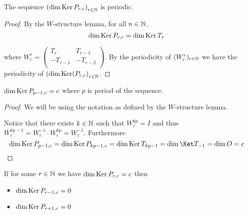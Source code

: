 \begin{proposition}
  The sequence $\left(\dim \operatorname{Ker} P_{r,c}\right)_{r\in\mathbb{N}}$
  is periodic.
\end{proposition}

\begin{proof}
  By the $W$-structure lemma, for all $n\in\mathbb{N}$,
  \[
  \dim\operatorname{Ker} P_{r,c}
  =
  \dim\operatorname{Ker} T_{r}
  \]

  where $W_{c}^{r}=\left(\begin{smallmatrix} T_{r} & T_{r-1}  \\ -T_{r-1} & -T_{r-2} \\\end{smallmatrix}\right)$.
  By the periodicity of $(W_{c}^{r})_{r\in\mathbb{N}}$ we have the
  periodicity of $\left(\dim\operatorname{Ker}(P_{r,c}\right)_{r\in\mathbb{N}}$.
\end{proof}

\begin{lemma}
  $\dim\operatorname{Ker} P_{p-1,c} = c$ where $p$ is period of the sequence.
\end{lemma}

\begin{proof}
  We will be using the notation as defined by the $W$-structure lemma.

  Notice that there exists $k\in\mathbb{N}$ such that $W_{c}^{kp} = I$ and
  thus $W_{c}^{kp-1} = W_{c}^{-1} \cdot W_{c}^{kp} = W_{c}^{-1}$.
  Furthermore
  \[
  \dim\Ker P_{p-1,c}
  =
  \dim\Ker P_{kp-1,c}
  =
  \dim\Ker T_{kp-1}
  =
  \dim\Ket T_{-1}
  =
  \dim O
  = c
  \]
\end{proof}

\begin{lemma}
  If for some $r\in\mathbb{N}$ we have $\dim\operatorname{Ker} P_{r,c} = c$ then
  \begin{itemize}
    \item $\dim\operatorname{Ker} P_{r-1,c} = 0$
    \item $\dim\operatorname{Ker} P_{r+1,c} = 0$
  \end{itemize}
\end{lemma}


